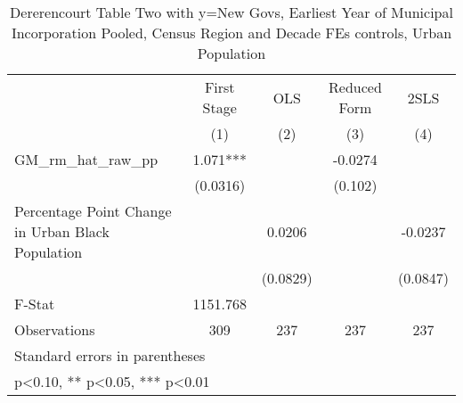 \begin{table}[htbp]\centering
\def\sym#1{\ifmmode^{#1}\else\(^{#1}\)\fi}
\caption{Dererencourt Table Two with y=New Govs, Earliest Year of Municipal Incorporation  Pooled, Census Region and Decade FEs controls, Urban Population}
\begin{tabular}{l*{4}{c}}
\toprule
                    & First Stage   &         OLS   &Reduced Form   &        2SLS   \\
                    &\multicolumn{1}{c}{(1)}   &\multicolumn{1}{c}{(2)}   &\multicolumn{1}{c}{(3)}   &\multicolumn{1}{c}{(4)}   \\
\midrule
GM\_rm\_hat\_raw\_pp    &       1.071***&               &     -0.0274   &               \\
                    &    (0.0316)   &               &     (0.102)   &               \\
\addlinespace
Percentage Point Change in Urban Black Population&               &      0.0206   &               &     -0.0237   \\
                    &               &    (0.0829)   &               &    (0.0847)   \\
\midrule
F-Stat              &    1151.768   &               &               &               \\
Observations        &         309   &         237   &         237   &         237   \\
\bottomrule
\multicolumn{5}{l}{\footnotesize Standard errors in parentheses}\\
\multicolumn{5}{l}{\footnotesize * p<0.10, ** p<0.05, *** p<0.01}\\
\end{tabular}
\end{table}
